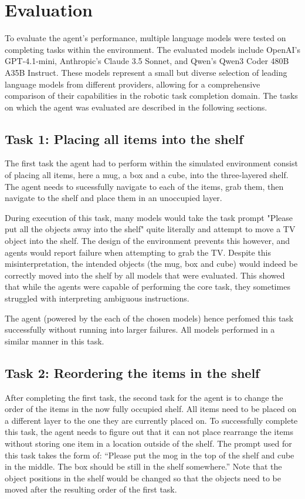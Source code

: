 \documentclass[../report.tex]{subfiles}
\begin{document}
\section{Evaluation}
\label{sec:evaluation}
To evaluate the agent's performance, multiple language models were tested on completing tasks within the environment. The evaluated models include OpenAI's GPT-4.1-mini, Anthropic's Claude 3.5 Sonnet, and Qwen's Qwen3 Coder 480B A35B Instruct. These models represent a small but diverse selection of leading language models from different providers, allowing for a comprehensive comparison of their capabilities in the robotic task completion domain. The tasks on which the agent was evaluated are described in the following sections.

\subsection{Task 1: Placing all items into the shelf}
The first task the agent had to perform within the simulated environment consist of placing all items, here a mug, a box and a cube, into the three-layered shelf. The agent needs to sucessfully navigate to each of the items, grab them, then navigate to the shelf and place them in an unoccupied layer.

During execution of this task, many models would take the task prompt "Please put all the objects away into the shelf" quite literally and attempt to move a TV object into the shelf. The design of the environment prevents this however, and agents would report failure when attempting to grab the TV. Despite this misinterpretation, the intended objects (the mug, box and cube) would indeed be correctly moved into the shelf by all models that were evaluated. This showed that while the agents were capable of performing the core task, they sometimes struggled with interpreting ambiguous instructions.

The agent (powered by the each of the chosen models) hence perfomed this task successfully without running into larger failures. All models performed in a similar manner in this task.

\subsection{Task 2: Reordering the items in the shelf}
After completing the first task, the second task for the agent is to change the order of the items in the now fully occupied shelf. All items need to be placed on a different layer to the one they are currently placed on. To successfully complete this task, the agent needs to figure out that it can not place rearrange the items without storing one item in a location outside of the shelf. The prompt used for this task takes the form of: ``Please put the mog in the top of the shelf and cube in the middle. The box should be still in the shelf somewhere.'' Note that the object positions in the shelf would be changed so that the objects need to be moved after the resulting order of the first task.
\end{document}
